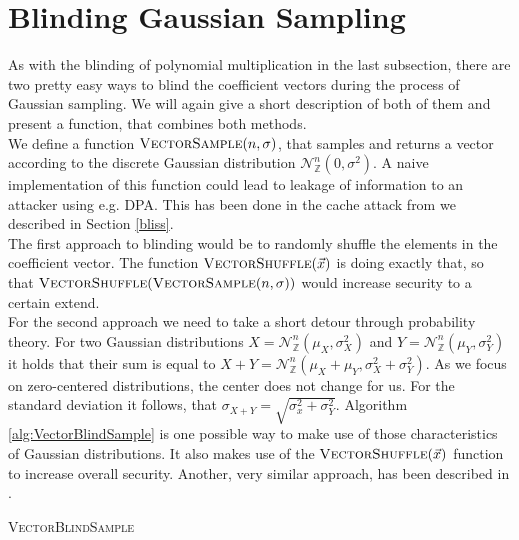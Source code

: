 \section{Blinding Gaussian Sampling}
As with the blinding of polynomial multiplication in the last subsection, there are two pretty easy ways to blind the coefficient vectors during the process of Gaussian sampling. We will again give a short description of both of them and present a function, that combines both methods.\\
We define a function \(\textsc{VectorSample}(n,\sigma)\), that samples and returns a vector according to the discrete Gaussian distribution \(\mathcal{N}_\mathbb{Z}^{n} (0, \sigma^2)\). A naive implementation of this function could lead to leakage of information to an attacker using e.g. DPA. This has been done in the cache attack from \cite{cryptoeprint:2016:300} we described in Section \ref{bliss}.\\
The first approach to blinding would be to randomly shuffle the elements in the coefficient vector. The function \(\textsc{VectorShuffle}(\vec{x})\) is doing exactly that, so that \(\textsc{VectorShuffle}(\textsc{VectorSample}(n,\sigma))\) would increase security to a certain extend.\\
For the second approach we need to take a short detour through probability theory. For two Gaussian distributions \(X=\mathcal{N}_\mathbb{Z}^{n} (\mu_X, \sigma^2_X)\) and \(Y=\mathcal{N}_\mathbb{Z}^{n} (\mu_Y, \sigma^2_Y)\) it holds that their sum is equal to \(X+Y=\mathcal{N}_\mathbb{Z}^{n} (\mu_X+\mu_Y, \sigma^2_X+\sigma^2_Y)\). As we focus on zero-centered distributions, the center does not change for us. For the standard deviation it follows, that \(\sigma_{X+Y}=\sqrt{\sigma^2_x+\sigma^2_Y}\). Algorithm \ref{alg:VectorBlindSample} is one possible way to make use of those characteristics of Gaussian distributions. It also makes use of the \(\textsc{VectorShuffle}(\vec{x})\) function to increase overall security. Another, very similar approach, has been described in \cite{cryptoeprint:2014:254}.


\begin{algorithm}
    \caption{\textsc{VectorBlindSample}}
    \label{alg:VectorBlindSample}
    \begin{algorithmic}[1]
        \EndFor\\
    \end{algorithmic}
\end{algorithm}